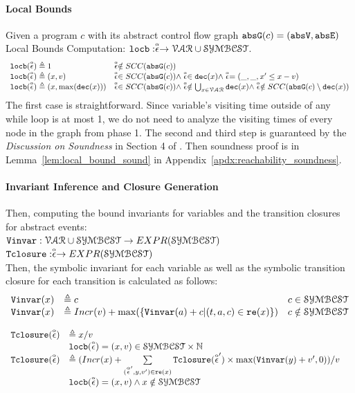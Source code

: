 \paragraph*{Local Bounds}
Given a program $c$ with its abstract control flow graph 
$\absG(c) = (\absV, \absE)$
\\
Local Bounds Computation:
$\locbound: \absevent \to \mathcal{VAR} \cup \constdom$.
%
\[ 
\begin{array}{ll}
  \locbound(\absevent) \triangleq 1 
  & \absevent \notin SCC(\absG(c))
  \\
  \locbound(\absevent) \triangleq (x, v) 
  & \absevent \in SCC(\absG(c)) \land \absevent \in \dec(x) \land  \absevent = (\_, \_ , x' \leq x - v) \\
  \locbound(\absevent) \triangleq (x, \max(\dec(x))) 
  & \absevent \in SCC(\absG(c)) \land 
  \absevent  \notin \bigcup_{x \in \mathcal{VAR}} \dec(x)
  \land \absevent \notin SCC(\absG(c) \setminus \dec(x)) 
\end{array}
  \]
  The first case is straightforward. Since variable's visiting time outside of any while loop is at most 1, we do not need to analyze the visiting times of every node in the graph from phase 1.
  The second and third step is guaranteed by the \emph{Discussion on Soundness} in Section 4 of \cite{sinn2017complexity}.
  Then soundness proof is in Lemma~\ref{lem:local_bound_sound} in Appendix~\ref{apdx:reachability_soundness}.
%
\paragraph*{Invariant Inference and Closure Generation }
Then, computing the bound invariants for variables and the transition closures for abstract events:
\\ 
$ \varinvar: \mathcal{VAR} \cup \constdom \to EXPR(\constdom)$
\\
$\absclr: \absevent \to EXPR(\constdom)$
\\
Then, the symbolic invariant for each variable 
as well as the symbolic transition closure for each transition is calculated as follows:
\[ 
\begin{array}{lll}
  \varinvar(x) & \triangleq c & c \in \constdom \\
  \varinvar(x) & \triangleq Incr(v) + \max(\{\varinvar(a) + c | (t, a, c) \in \reset(x)\}) & c \notin \constdom
\end{array}
\]
%
\begin{defn}
  \label{def:transition_closure_base}
\[ 
\begin{array}{lll}
  \absclr(\absevent) 
  & \triangleq x / v & \\ 
  & \locbound(\absevent) = (x, v) \in \constdom \times \mathbb{N} & \\
  \absclr(\absevent) 
  & \triangleq (Incr(x) + 
  \sum\limits_{(\absevent', y, v') \in \reset(x)}
  \absclr(\absevent') \times \max(\varinvar(y) + v', 0) ) / v & \\
  & \locbound(\absevent) = (x, v) \land x \notin \constdom & 
\end{array}
  \]
\end{defn}
%
